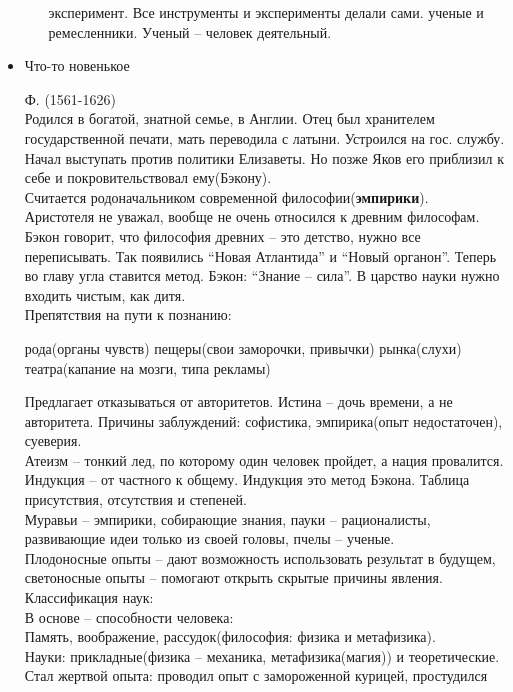 \documentclass[a4paper,12pt]{report} %
\begin{document}
\begin{itemize}
\begin{enumerate}
  эксперимент. Все инструменты и эксперименты делали сами.
 ученые и ремесленники. Ученый -- человек деятельный.
\end{enumerate}
\item Что-то новенькое
\begin{itemize}
 Ф. (1561-1626)\\
Родился в богатой, знатной семье, в Англии. Отец был хранителем государственной
печати, мать переводила с латыни. Устроился на гос. службу. Начал
выступать против политики Елизаветы. Но позже Яков его приблизил к
себе и покровительствовал ему(Бэкону).\\
Считается родоначальником современной философии(\textbf{эмпирики}).\\
Аристотеля не уважал, вообще не очень относился к древним
философам. Бэкон говорит, что философия древних -- это детство, нужно
все переписывать. Так появились ``Новая Атлантида'' и ``Новый
органон''. Теперь во главу угла ставится метод. Бэкон: ``Знание --
сила''. В царство науки нужно входить чистым, как дитя.\\
Препятствия на пути к познанию:
\begin{enumerate}
 рода(органы чувств)
 пещеры(свои заморочки, привычки)
 рынка(слухи)
 театра(капание на мозги, типа рекламы)
\end{enumerate}
Предлагает отказываться от авторитетов. Истина -- дочь времени, а не
авторитета. Причины заблуждений: софистика, эмпирика(опыт
недостаточен), суеверия.\\
Атеизм -- тонкий лед, по которому один человек пройдет, а нация
провалится.\\
Индукция -- от частного к общему. Индукция это метод Бэкона. Таблица
присутствия, отсутствия и степеней.\\
Муравьи -- эмпирики, собирающие знания, пауки -- рационалисты,
развивающие идеи только из своей головы, пчелы -- ученые.\\
Плодоносные опыты -- дают возможность использовать результат в будущем, светоносные опыты -- помогают открыть скрытые
причины явления.\\
Классификация наук:\\
В основе -- способности человека:\\
Память, воображение, рассудок(философия: физика и метафизика).\\
Науки: прикладные(физика -- механика, метафизика(магия)) и
теоретические.\\
Стал жертвой опыта: проводил опыт с замороженной курицей, простудился

\end{itemize}
\end{itemize}
\end{document}
